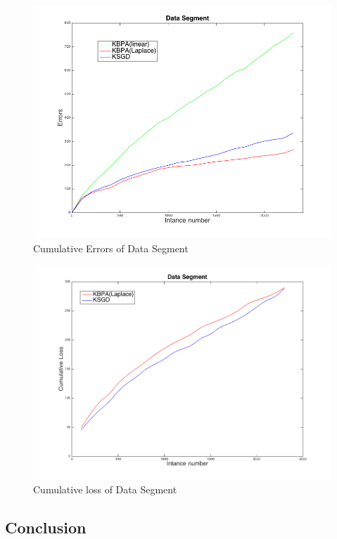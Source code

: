 \begin{figure}[h!]
\label{pic:SKCM}
\centerline{
\includegraphics[scale = 0.4]{fig05/mc/Segment_kernel_CM.png}}
\caption{Cumulative Errors of Data Segment}
\end{figure}

\begin{figure}[h!]
\label{pic:SKR}
\centerline{
\includegraphics[scale = 0.4]{fig05/mc/Segment_kernel_R.png}}
\caption{Cumulative loss of Data Segment}
\end{figure}
\subsection{Conclusion}
